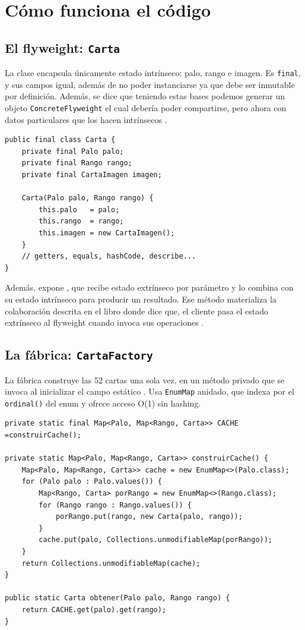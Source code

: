 \documentclass{article}
\begin{document}
\section{Cómo funciona el código}

\subsection{El flyweight: \texttt{Carta}}

La clase  encapsula únicamente estado intrínseco: palo, rango e imagen. Es \texttt{final}, y sus campos igual, además de no poder instanciarse ya que debe ser inmutable por definición. Además, se dice que teniendo estas bases podemos generar un objeto \texttt{ConcreteFlyweight} el cual debería poder compartirse, pero ahora con datos particulares que los hacen intrínsecos \cite[p.~199]{gamma1994design}.

\begin{verbatim}
public final class Carta {
    private final Palo palo;
    private final Rango rango;
    private final CartaImagen imagen;

    Carta(Palo palo, Rango rango) {
        this.palo   = palo;
        this.rango  = rango;
        this.imagen = new CartaImagen();
    }
    // getters, equals, hashCode, describe...
}
\end{verbatim}

Además,  expone , que recibe estado extrínseco por parámetro y lo combina con su estado intrínseco para producir un resultado. Ese método materializa la colaboración descrita en el libro donde dice que, el cliente pasa el estado extrínseco al flyweight cuando invoca sus operaciones \cite[p.~199]{gamma1994design}.

\subsection{La fábrica: \texttt{CartaFactory}}

La fábrica construye las 52 cartas una sola vez, en un método privado que se invoca al inicializar el campo estático . Usa \texttt{EnumMap} anidado, que indexa por el \texttt{ordinal()} del enum y ofrece acceso O(1) sin hashing.

\begin{verbatim}
private static final Map<Palo, Map<Rango, Carta>> CACHE =construirCache();

private static Map<Palo, Map<Rango, Carta>> construirCache() {
    Map<Palo, Map<Rango, Carta>> cache = new EnumMap<>(Palo.class);
    for (Palo palo : Palo.values()) {
        Map<Rango, Carta> porRango = new EnumMap<>(Rango.class);
        for (Rango rango : Rango.values()) {
            porRango.put(rango, new Carta(palo, rango));
        }
        cache.put(palo, Collections.unmodifiableMap(porRango));
    }
    return Collections.unmodifiableMap(cache);
}

public static Carta obtener(Palo palo, Rango rango) {
    return CACHE.get(palo).get(rango);
}
\end{verbatim}
\end{document}
